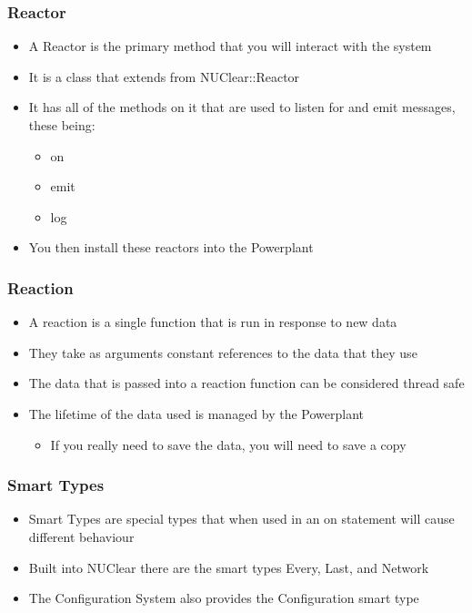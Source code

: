 \documentclass{beamer}
\begin{document}
\begin{frame}
	\frametitle{Reactor}
	\begin{itemize}
		\item A Reactor is the primary method that you will interact with the system
		\item It is a class that extends from NUClear::Reactor
		\item It has all of the methods on it that are used to listen for and emit messages, these being:
			\begin{itemize}
				\item on
				\item emit
				\item log
			\end{itemize}
		\item You then install these reactors into the Powerplant
	\end{itemize}
\end{frame}

\begin{frame}
	\frametitle{Reaction}
	\begin{itemize}
		\item A reaction is a single function that is run in response to new data
		\item They take as arguments constant references to the data that they use
		\item The data that is passed into a reaction function can be considered thread safe
		\item The lifetime of the data used is managed by the Powerplant 
			\begin{itemize}
				\item If you really need to save the data, you will need to save a copy
			\end{itemize}
	\end{itemize}
\end{frame}

\begin{frame}
	\frametitle{Smart Types}
	\begin{itemize}
		\item Smart Types are special types that when used in an on statement will cause different behaviour
		\item Built into NUClear there are the smart types Every, Last, and Network
		\item The Configuration System also provides the Configuration smart type
	\end{itemize}
\end{frame}
\end{document}
